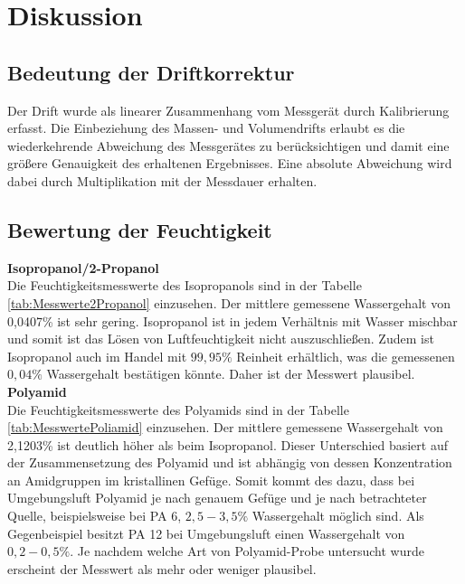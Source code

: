 \newpage
\section{Diskussion}
\label{sec:diskussion}


\subsection{Bedeutung der Driftkorrektur}
Der Drift wurde als linearer Zusammenhang vom Messgerät durch Kalibrierung erfasst. Die Einbeziehung des Massen- und Volumendrifts erlaubt es die wiederkehrende Abweichung des Messgerätes zu berücksichtigen und damit eine größere Genauigkeit des erhaltenen Ergebnisses. Eine absolute Abweichung wird dabei durch Multiplikation mit der Messdauer erhalten.



\subsection{Bewertung der Feuchtigkeit}

\textbf{Isopropanol/2-Propanol}\\
Die Feuchtigkeitsmesswerte des Isopropanols sind in der Tabelle \ref{tab:Messwerte2Propanol} einzusehen. Der mittlere gemessene Wassergehalt von 0,0407\% ist sehr gering. Isopropanol ist in jedem Verhältnis mit Wasser mischbar und somit ist das Lösen von Luftfeuchtigkeit nicht auszuschließen.\cite{isopropanol} Zudem ist Isopropanol auch im Handel mit $99,95\%$ Reinheit erhältlich, was die gemessenen $0,04\%$ Wassergehalt bestätigen könnte.\cite{isoprop} Daher ist der Messwert plausibel.\\

\textbf{Polyamid}\\
Die Feuchtigkeitsmesswerte des Polyamids sind in der Tabelle \ref{tab:MesswertePoliamid} einzusehen. Der mittlere gemessene Wassergehalt von 2,1203\% ist deutlich höher als beim Isopropanol. Dieser Unterschied basiert auf der Zusammensetzung des Polyamid und ist abhängig von dessen Konzentration an Amidgruppen im kristallinen Gefüge. Somit kommt des dazu, dass bei Umgebungsluft Polyamid je nach genauem Gefüge und je nach betrachteter Quelle, beispielsweise bei PA 6, $2,5-3,5\%$ Wassergehalt möglich sind.\cite{Wikipedia.2020,Kaiser.2006} Als Gegenbeispiel besitzt PA 12 bei Umgebungsluft einen Wassergehalt von $0,2-0,5\%$.\cite{Wikipedia.2020} Je nachdem welche Art von Polyamid-Probe untersucht wurde erscheint der Messwert als mehr oder weniger plausibel.\\

